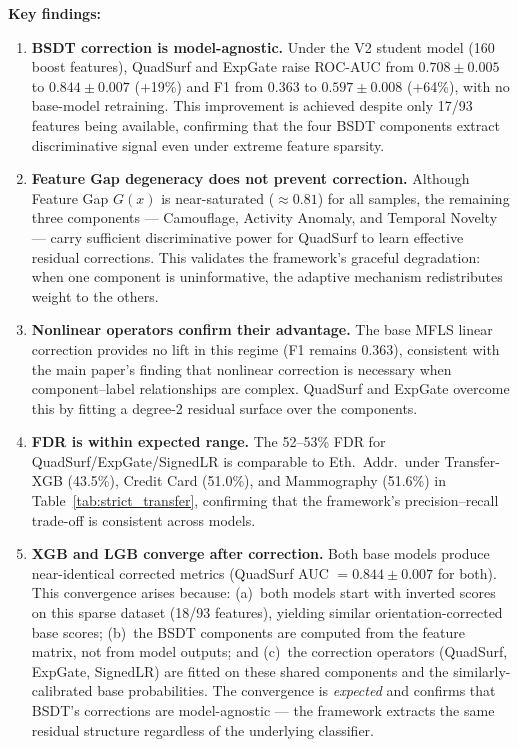 \documentclass[journal]{IEEEtran}
\begin{document}
\textbf{Key findings:}

\begin{enumerate}
  \item \textbf{BSDT correction is model-agnostic.} Under the V2 student model (160 boost features), QuadSurf and ExpGate raise ROC-AUC from $0.708{\pm}0.005$ to $0.844{\pm}0.007$ (+19\%) and F1 from $0.363$ to $0.597{\pm}0.008$ (+64\%), with no base-model retraining. This improvement is achieved despite only 17/93 features being available, confirming that the four BSDT components extract discriminative signal even under extreme feature sparsity.

  \item \textbf{Feature Gap degeneracy does not prevent correction.} Although Feature Gap $G(x)$ is near-saturated ($\approx 0.81$) for all samples, the remaining three components --- Camouflage, Activity Anomaly, and Temporal Novelty --- carry sufficient discriminative power for QuadSurf to learn effective residual corrections. This validates the framework's graceful degradation: when one component is uninformative, the adaptive mechanism redistributes weight to the others.

  \item \textbf{Nonlinear operators confirm their advantage.} The base MFLS linear correction provides no lift in this regime (F1 remains 0.363), consistent with the main paper's finding that nonlinear correction is necessary when component--label relationships are complex. QuadSurf and ExpGate overcome this by fitting a degree-2 residual surface over the components.

  \item \textbf{FDR is within expected range.} The 52--53\% FDR for QuadSurf/ExpGate/SignedLR is comparable to Eth.\ Addr.\ under Transfer-XGB (43.5\%), Credit Card (51.0\%), and Mammography (51.6\%) in Table~\ref{tab:strict_transfer}, confirming that the framework's precision--recall trade-off is consistent across models.

  \item \textbf{XGB and LGB converge after correction.} Both base models produce near-identical corrected metrics (QuadSurf AUC $= 0.844{\pm}0.007$ for both). This convergence arises because: (a)~both models start with inverted scores on this sparse dataset (18/93 features), yielding similar orientation-corrected base scores; (b)~the BSDT components are computed from the feature matrix, not from model outputs; and (c)~the correction operators (QuadSurf, ExpGate, SignedLR) are fitted on these shared components and the similarly-calibrated base probabilities. The convergence is \emph{expected} and confirms that BSDT's corrections are model-agnostic --- the framework extracts the same residual structure regardless of the underlying classifier.
\end{enumerate}
\end{document}
